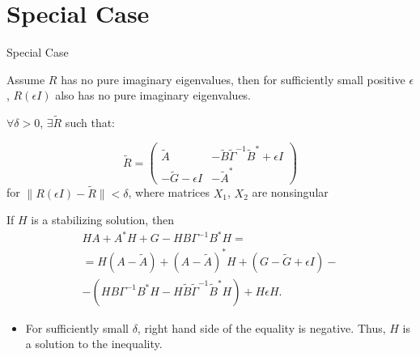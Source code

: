 \section{Special Case}
\begin{frame}{Special Case}

Assume $R$ has no pure imaginary eigenvalues, then for sufficiently small positive $\epsilon$, $R(\epsilon I)$ also has no pure imaginary eigenvalues. 

\begin{block}{}
$\forall  \delta > 0$, $\exists \tilde R $ such that: 

$$ \tilde R = \left(\begin{array}{cc} 
\tilde A & -\tilde B\tilde\Gamma ^{-1}\tilde B^{*} + \epsilon I \\  
-\tilde G -\epsilon I & -\tilde A^{*} \end{array}\right)
$$
for $\|R(\epsilon I)-\tilde R\|<\delta$, where matrices $X_{1}$, $X_{2}$ are nonsingular
\end{block}


If $H$ is a stabilizing solution, then 
$$\begin{array}{c} HA + A^{*}H + G - HB\Gamma^{-1}B^{*}H = \\
= H(A-\tilde A) + (A-\tilde A)^{*}H + (G-\tilde G+\epsilon I) - \\
- (HB\Gamma^{-1}B^{*}H - H\tilde B\tilde\Gamma^{-1}\tilde B^{*}H) + H\epsilon H.
\end{array}
$$ 

\begin{itemize}
\item For sufficiently small $\delta$, right hand side of the equality is negative. Thus, $H$ is a solution to the inequality.
\end{itemize}



\end{frame}


